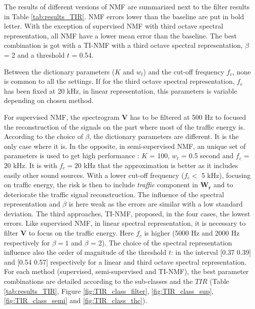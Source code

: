 \documentclass[twocolumn,a4paper,10pt]{article}
\begin{document}
The results of different versions of NMF are summarized next to the filter results in Table \ref{tab:results_TIR}. NMF errors lower than the baseline are put in bold letter. With the exception of supervised NMF with third octave spectral representation, all NMF have a lower mean error than the baseline. The best combination is got with a TI-NMF with a third octave spectral representation, $\beta$ = 2 and a threshold $t$ = 0.54.

Between the dictionary parameters ($K$ and $w_t$) and the cut-off frequency $f_c$, none is common to all the settings. If for the third octave spectral representation, $f_c$ has been fixed at 20 kHz, in linear representation, this parameters is variable depending on chosen method.

For supervised NMF, the spectrogram $\mathbf{V}$ has to be filtered at 500 Hz to focused the reconstruction of the signals on the part where most of the traffic energy is. According to the choice of $\beta$, the dictionary parameters are different. It is the only case where it is.
In the opposite, in semi-supervised NMF, an unique set of parameters is used to get high performance : $K$ = 100, $w_t$ = 0.5 second and $f_c$ = 20 kHz. It is with $f_c = 20$ kHz that the approximation is better as it includes easily other sound sources. With a lower cut-off frequency ($ f_c <$ 5 kHz), focusing on traffic energy, the risk is then to include \textit{traffic} component in $\mathbf{W_r}$ and to deteriorate the traffic signal reconstruction. The influence of the spectral representation and $\beta$ is here weak as the errors are similar with a low standard deviation. The third approaches, TI-NMF, proposed, in the four cases, the lowest errors. Like supervised NMF, in linear spectral representation, it is necessary to filter $\mathbf{V}$ to focus on the traffic energy. Here $f_c$ is higher (5000 Hz and 2000 Hz respectively for $\beta = 1$ and $\beta$ = 2). The choice of the spectral representation influence also the order of magnitude of the threshold $t$: in the interval [0.37 0.39] and [0.54 0.57] respectively for a linear and third octave spectral representation.\\

For each method (supervised, semi-supervised and TI-NMF), the best parameter combinations are detailed according to the sub-classes and the $TIR$ (Table \ref{tab:results_TIR},  Figure \ref{fig:TIR_class_filter}, \ref{fig:TIR_class_sup}, \ref{fig:TIR_class_semi} and \ref{fig:TIR_class_thc}). \\
\end{document}
